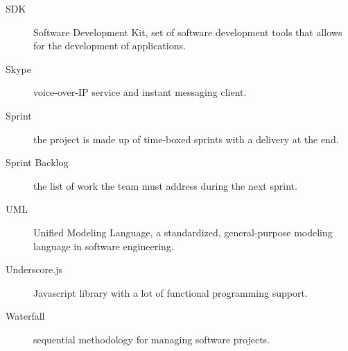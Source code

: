 \begin{description}
   \item[SDK] Software Development Kit, set of software development tools that allows for the development of applications.
   \item[Skype] voice-over-IP service and instant messaging client.
   \item[Sprint] the project is made up of time-boxed sprints with a delivery at the end.
   \item[Sprint Backlog] the list of work the team must address during the next sprint.
   \item[UML] Unified Modeling Language, a standardized, general-purpose modeling language in software engineering. 
   \item[Underscore.js] Javascript library with a lot of functional programming support.
   \item[Waterfall] sequential methodology for managing software projects.
\end{description}
